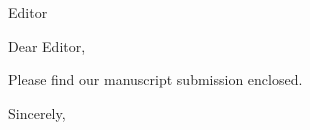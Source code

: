 \documentclass[12pt]{letter}
\begin{document}
\begin{letter}{Editor}
\opening{Dear Editor,}

Please find our manuscript submission enclosed.

\closing{Sincerely,}

\end{letter}
\end{document}
